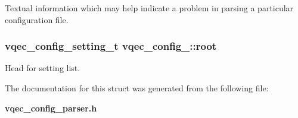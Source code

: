 Textual information which may help indicate a problem in parsing a particular configuration file. 
\subsubsection{\setlength{\rightskip}{0pt plus 5cm}\bf{vqec\_\-config\_\-setting\_\-t} \bf{vqec\_\-config\_\-::root}}\label{structvqec__config___55f047d7a1de12f7f3c0b584e16a32fe}


Head for setting list. 

The documentation for this struct was generated from the following file:\begin{CompactItemize}
\item 
\bf{vqec\_\-config\_\-parser.h}\end{CompactItemize}
